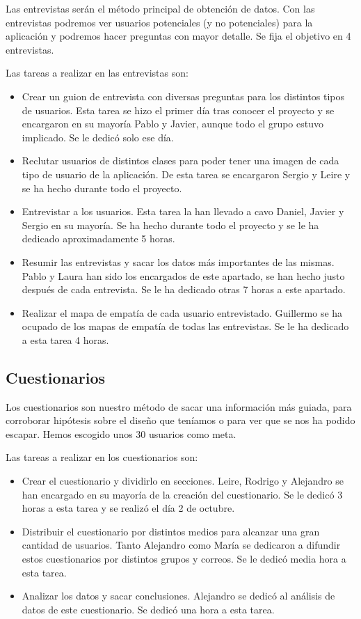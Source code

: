 Las entrevistas serán el método principal de obtención de datos. Con las entrevistas podremos ver usuarios potenciales (y no potenciales) para la aplicación y podremos hacer preguntas con mayor detalle. Se fija el objetivo en 4 entrevistas.

Las tareas a realizar en las entrevistas son:
\begin{itemize}
    \item Crear un guion de entrevista con diversas preguntas para los distintos tipos de usuarios. Esta tarea se hizo el primer día tras conocer el proyecto y se encargaron en su mayoría Pablo y Javier, aunque todo el grupo estuvo implicado. Se le dedicó solo ese día.
    \item Reclutar usuarios de distintos clases para poder tener una imagen de cada tipo de usuario de la aplicación. De esta tarea se encargaron Sergio y Leire y se ha hecho durante todo el proyecto.
    \item Entrevistar a los usuarios. Esta tarea la han llevado a cavo Daniel, Javier y Sergio en su mayoría. Se ha hecho durante todo el proyecto y se le ha dedicado aproximadamente 5 horas.
    \item Resumir las entrevistas y sacar los datos más importantes de las mismas. Pablo y Laura han sido los encargados de este apartado, se han hecho justo después de cada entrevista. Se le ha dedicado otras 7 horas a este apartado.
    \item Realizar el mapa de empatía de cada usuario entrevistado. Guillermo se ha ocupado de los mapas de empatía de todas las entrevistas. Se le ha dedicado a esta tarea 4 horas.
\end{itemize}

\subsection{Cuestionarios} \label{subsec:cuestionarios}

Los cuestionarios son nuestro método de sacar una información más guiada, para corroborar hipótesis sobre el diseño que teníamos o para ver que se nos ha podido escapar. Hemos escogido unos 30 usuarios como meta.

Las tareas a realizar en los cuestionarios son:
\begin{itemize}
    \item Crear el cuestionario y dividirlo en secciones. Leire, Rodrigo y Alejandro se han encargado en su mayoría de la creación del cuestionario. Se le dedicó 3 horas a esta tarea y se realizó el día 2 de octubre.
    \item Distribuir el cuestionario por distintos medios para alcanzar una gran cantidad de usuarios. Tanto Alejandro como María se dedicaron a difundir estos cuestionarios por distintos grupos y correos. Se le dedicó media hora a esta tarea.
    \item Analizar los datos y sacar conclusiones. Alejandro se dedicó al análisis de datos de este cuestionario. Se dedicó una hora a esta tarea.
\end{itemize}

